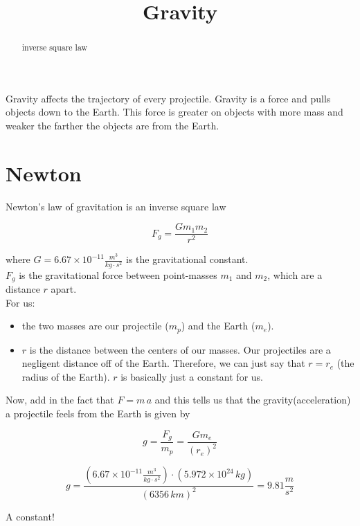 \documentclass{ximera}
\title{Gravity}
\begin{document}
\begin{abstract}
inverse square law
\end{abstract}
\maketitle




Gravity affects the trajectory of every projectile.  Gravity is a force and pulls objects down to the Earth. This force is greater on objects with more mass and weaker the farther the objects are from the Earth.




\section{Newton}

Newton's law of gravitation is an inverse square law

\[ F_g = \frac{G m_1 m_2}{r^2}    \]




where $G = 6.67 \times 10^{-11} \frac{m^3}{kg \cdot s^2}$ is the gravitational constant. \\


$F_g$ is the gravitational force between point-masses $m_1$ and $m_2$, which are a distance $r$ apart. \\


For us:
\begin{itemize}
\item the two masses are our projectile ($m_p$) and the Earth ($m_e$).
\item $r$ is the distance between the centers of our masses. Our projectiles are a negligent distance off of the Earth.  Therefore, we can just say that $r = r_e$ (the radius of the Earth).  $r$ is basically just a constant for us.
\end{itemize}



Now, add in the fact that $F = m \, a$ and this tells us that the gravity(acceleration) a projectile feels from the Earth is given by


\[ g = \frac{F_g}{m_p}  = \frac{G m_e}{(r_e)^2}    \]


\[ g = \frac{(6.67 \times 10^{-11} \frac{m^3}{kg \cdot s^2}) \cdot (5.972 \times 10^{24} \, kg)}{(6356 \, km)^2} = 9.81 \frac{m}{s^2}   \]


A constant! \\
\end{document}
